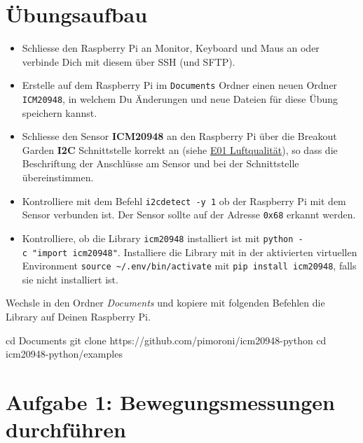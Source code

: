\documentclass[
  11pt,
  a4paperpaper,
  oneside, openany  ,captions=tableheading
]{scrbook}
\newenvironment{Shaded}{\begin{snugshade}}{\end{snugshade}}
\newcommand{\BuiltInTok}[1]{\textcolor[rgb]{0.00,0.23,0.31}{#1}}
\newcommand{\FunctionTok}[1]{\textcolor[rgb]{0.28,0.35,0.67}{#1}}
\newcommand{\NormalTok}[1]{\textcolor[rgb]{0.00,0.23,0.31}{#1}}
\providecommand{\tightlist}{%
  \setlength{\itemsep}{0pt}\setlength{\parskip}{0pt}}
\theoremstyle{definition}
\theoremstyle{remark}
\begin{document}
\section{Übungsaufbau}\label{uxfcbungsaufbau-2}

\begin{itemize}
\tightlist
\item
  Schliesse den Raspberry Pi an Monitor, Keyboard und Maus an oder
  verbinde Dich mit diesem über SSH (und SFTP).
\item
  Erstelle auf dem Raspberry Pi im \texttt{Documents} Ordner einen neuen
  Ordner \texttt{ICM20948}, in welchem Du Änderungen und neue Dateien
  für diese Übung speichern kannst.
\item
  Schliesse den Sensor \textbf{ICM20948} an den Raspberry Pi über die
  Breakout Garden \textbf{I2C} Schnittstelle korrekt an (siehe
  \href{E01_Luftqualitaet.qmd}{E01 Luftqualität}), so dass die
  Beschriftung der Anschlüsse am Sensor und bei der Schnittstelle
  übereinstimmen.
\item
  Kontrolliere mit dem Befehl \texttt{i2cdetect\ -y\ 1} ob der Raspberry
  Pi mit dem Sensor verbunden ist. Der Sensor sollte auf der Adresse
  \texttt{0x68} erkannt werden.
\item
  Kontrolliere, ob die Library \texttt{icm20948} installiert ist mit
  \texttt{python\ -c\ "import\ icm20948"}. Installiere die Library mit
  in der aktivierten virtuellen Environment
  \texttt{source\ \textasciitilde{}/.env/bin/activate} mit
  \texttt{pip\ install\ icm20948}, falls sie nicht installiert ist.
\end{itemize}

Wechsle in den Ordner \emph{Documents} und kopiere mit folgenden
Befehlen die Library auf Deinen Raspberry Pi.

\begin{Shaded}
\begin{Highlighting}[]
\BuiltInTok{cd}\NormalTok{ Documents}
\FunctionTok{git}\NormalTok{ clone https://github.com/pimoroni/icm20948{-}python}
\BuiltInTok{cd}\NormalTok{ icm20948{-}python/examples}
\end{Highlighting}
\end{Shaded}

\section{Aufgabe 1: Bewegungsmessungen
durchführen}\label{aufgabe-1-bewegungsmessungen-durchfuxfchren}
\end{document}
